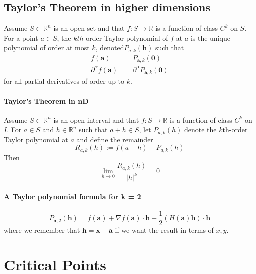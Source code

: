 \documentclass[11pt]{article}
\newcommand{\tb}[1]{\textbf{#1}}
\newcommand{\real}[0]{\mathbb{R}}
\begin{document}
\subsection{Taylor's Theorem in higher dimensions}
Assume $S \subset \real^n$ is an open set and that $f: S \rightarrow \real$ is a function of class $C^k$ on $S$. For a point $a\in S$, the $kth$ order Taylor polynomial of $f$ at $a$ is the unique polynomial of order at most $k$, denoted$P_{a,k}(\tb{h})$ such that
\begin{align*}
    f(\tb{a}) &= P_{\tb{a},k}(\tb{0}) \\
    \partial^\alpha f(\tb{a}) &= \partial^\alpha P_{\tb{a},k}(\tb{0})
\end{align*}
for all partial derivatives of order up to $k$.

\paragraph{Taylor's Theorem in nD}Assume $S \subset \real^n$ is an open interval and that $f: S \rightarrow \real$ is a function of class $C^k$ on $I$. For $a \in S$ and $h \in \real^n$ such that $a+h\in S$, let $P_{a,k}(h)$ denote the $k$th-order Taylor polynomial at $a$ and define the remainder
$$R_{a,k}(h) := f(a+h) - P_{a,k}(h)$$
Then $$\lim_{h\rightarrow0}\frac{R_{a,k}(h)}{|h|^k} = 0$$

\paragraph{A Taylor polynomial formula for k = 2}
\begin{equation*}
P_{\tb{a},2}(\tb{h}) = f(\tb{a}) + \nabla f(\tb{a})\cdot \tb{h} + \frac{1}{2}(H(\tb{a})\tb{h})\cdot \tb{h}
\end{equation*}
where we remember that $\tb{h} = \tb{x} - \tb{a}$ if we want the result in terms of $x,y$. 

\section{Critical Points}
\end{document}
